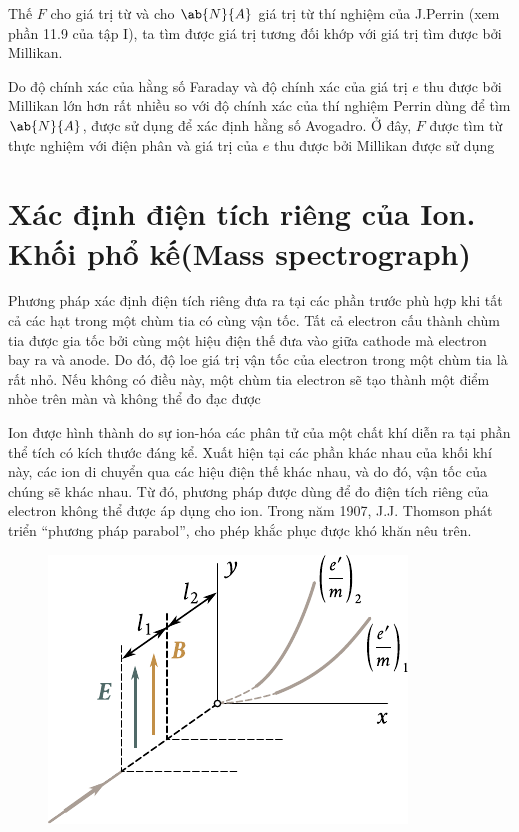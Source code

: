 Thế $F$ cho  giá trị từ  và cho $\ab{N}{A}$ giá trị từ thí nghiệm của J.Perrin (xem phần 11.9 của tập I), ta tìm được giá trị tương đối khớp với giá trị tìm được bởi Millikan.

Do độ chính xác của hằng số Faraday và độ chính xác của giá trị $e$ thu được bởi Millikan lớn hơn rất nhiều so với độ chính xác của thí nghiệm Perrin dùng để tìm $\ab{N}{A}$,  được sử dụng để xác định hằng số Avogadro.
Ở đây, $F$ được tìm từ thực nghiệm với điện phân và giá trị của $e$ thu được bởi Millikan được sử dụng

\section{Xác định điện tích riêng của Ion. Khối phổ kế(Mass spectrograph)}\label{sec:10_4}

Phương pháp xác định điện tích riêng đưa ra tại các phần trước phù hợp khi tất cả các hạt trong một chùm tia có cùng vận tốc.
Tất cả electron cấu thành chùm tia được gia tốc bởi cùng một hiệu điện thế đưa vào giữa cathode mà electron bay ra và anode.
Do đó, độ loe giá trị vận tốc của electron trong một chùm tia là rất nhỏ.
Nếu không có điều này, một chùm tia electron sẽ tạo thành một điểm nhòe trên màn và không thể đo đạc được

Ion được hình thành do sự ion-hóa các phân tử của một chất khí diễn ra tại phần thể tích có kích thước đáng kể.
Xuất hiện tại các phần khác nhau của khối khí này, các ion di chuyển qua các hiệu điện thế khác nhau, và do đó, vận tốc của chúng sẽ khác nhau.
Từ đó, phương pháp được dùng để đo điện tích riêng của electron không thể được áp dụng cho ion.
Trong năm 1907, J.J. Thomson phát triển ``phương pháp parabol'', cho phép khắc phục được khó khăn nêu trên.

\begin{figure}[t]
	\begin{center}
		\includegraphics[scale=1]{figures/ch_10/fig_10_9.pdf}
		\caption[]{}
		\label{fig:10_9}
	\end{center}
	\vspace{-0.8cm}
\end{figure}

